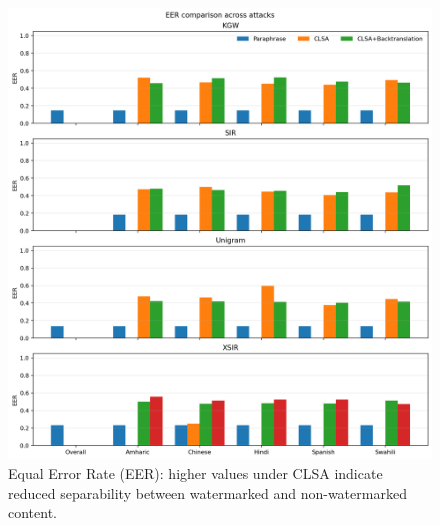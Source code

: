 \documentclass{article}
\begin{document}
\begin{figure}[h]
\centering
\includegraphics[width=\linewidth]{eer_bars.png}
\caption{Equal Error Rate (EER): higher values under CLSA indicate reduced separability between watermarked and non-watermarked content.}
\end{figure}
\end{document}
